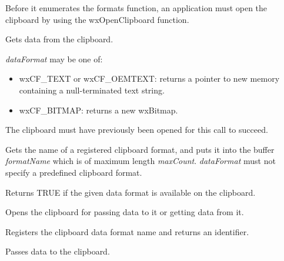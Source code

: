Before it enumerates the formats function, an application must open the clipboard by using the 
wxOpenClipboard function. 



Gets data from the clipboard.

{\it dataFormat} may be one of:

\begin{itemize}\itemsep=0pt
\item wxCF\_TEXT or wxCF\_OEMTEXT: returns a pointer to new memory containing a null-terminated text string.
\item wxCF\_BITMAP: returns a new wxBitmap.
\end{itemize}

The clipboard must have previously been opened for this call to succeed.



Gets the name of a registered clipboard format, and puts it into the buffer {\it formatName} which is of maximum
length {\it maxCount}. {\it dataFormat} must not specify a predefined clipboard format.



Returns TRUE if the given data format is available on the clipboard.



Opens the clipboard for passing data to it or getting data from it.



Registers the clipboard data format name and returns an identifier.



Passes data to the clipboard.

